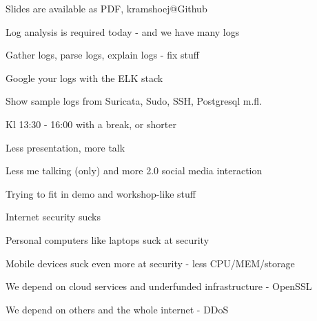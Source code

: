 \documentclass[20pt,landscape,a4paper,footrule]{foils}
\begin{document}




\vskip 2cm
\centerline{\tiny Slides are available as PDF, kramshoej@Github}


\begin{list1}
\item Log analysis is required today - and we have many logs
\item Gather logs, parse logs, explain logs - fix stuff
\item Google your logs with the ELK stack
\item Show sample logs from Suricata, Sudo, SSH, Postgresql m.fl.
\end{list1}



\begin{list1}
\item Kl 13:30 - 16:00 with a break, or shorter
\item Less presentation, more talk
\item Less me talking (only) and more 2.0 social media interaction
\end{list1}

\centerline{Trying to fit in demo and workshop-like stuff}



\begin{list1}
\item Internet security sucks
\item Personal computers like laptops suck at security
\item Mobile devices suck even more at security - less CPU/MEM/storage
\item We depend on cloud services and underfunded infrastructure - OpenSSL
\item We depend on others and the whole internet - DDoS
\end{list1}
\end{document}
